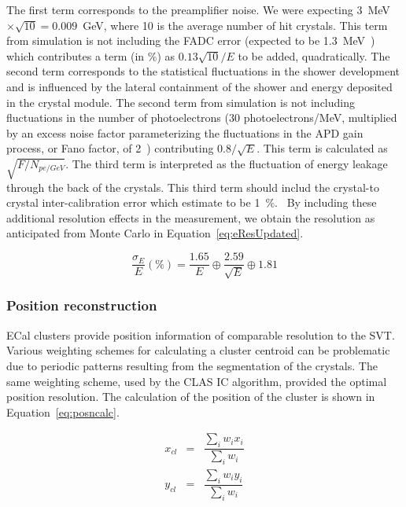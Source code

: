 The first term corresponds to the preamplifier noise. We were expecting 3~MeV$\times \sqrt{10} = 0.009$~GeV, where 10 is the average number of hit crystals. This term from simulation is not including the FADC error (expected to be 1.3~MeV~\cite{charles_2014}) which contributes a term (in $\%$) as $0.13\sqrt{10}/E$ to be added, quadratically. The second term corresponds to the statistical fluctuations in the shower development and is influenced by the lateral containment of the shower and energy deposited in the crystal module. The second term from simulation is not including fluctuations in the number of photoelectrons (30 photoelectrons/MeV, multiplied by an excess noise factor parameterizing the fluctuations in the APD gain process, or Fano factor, of 2~\cite{panda_2008}) contributing $0.8/\sqrt{E}$. This term is calculated as $\sqrt{F/N_{pe/GeV}}$. The third term is interpreted as the fluctuation of energy leakage through the back of the crystals. This third term should includ the crystal-to crystal inter-calibration error which estimate to be 1~$\%$.~\cite{szumila-vance_hps_ecal_2014} By including these additional resolution effects in the measurement, we obtain the resolution as anticipated from Monte Carlo in Equation~\eqref{eq:eResUpdated}.

\begin{equation}
\label{eq:eResUpdated}
\dfrac{\sigma_E}{E} (\%) = \dfrac{1.65}{E} \oplus \dfrac{2.59}{\sqrt{E}} \oplus 1.81 
\end{equation}

\subsubsection{Position reconstruction}
\indent ECal clusters provide position information of comparable resolution to the SVT. Various weighting schemes for calculating a cluster centroid can be problematic due to periodic patterns resulting from the segmentation of the crystals. The same weighting scheme, used by the CLAS IC algorithm, provided the optimal position resolution. The calculation of the position of the cluster is shown in Equation~\eqref{eq:posncalc}.~\cite{szumila-vance_hps_ecal_2014}

\begin{eqnarray*}
\label{eq:posncalc}
x_{cl} & = & \dfrac{\sum_i w_i x_i}{\sum_i w_i}\\
y_{cl} & = & \dfrac{\sum_i w_i y_i}{\sum_i w_i}\\
\end{eqnarray*}

